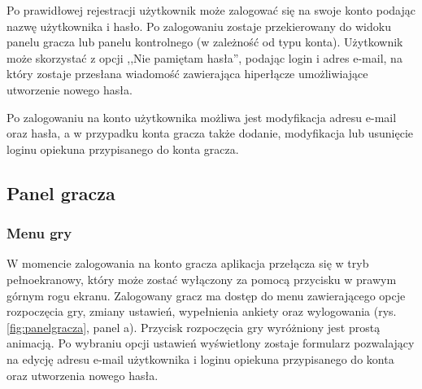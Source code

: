         Po prawidłowej rejestracji użytkownik może zalogować się na swoje konto podając nazwę użytkownika i hasło. Po zalogowaniu zostaje przekierowany do widoku panelu gracza lub panelu kontrolnego (w zależność od typu konta).
        Użytkownik może skorzystać z opcji ,,Nie pamiętam hasła'', podając login i adres e-mail, na który zostaje przesłana wiadomość zawierająca hiperłącze umożliwiające utworzenie nowego hasła.
        
        Po zalogowaniu na konto użytkownika możliwa jest modyfikacja adresu e-mail oraz hasła, a w przypadku konta gracza także dodanie, modyfikacja lub usunięcie loginu opiekuna przypisanego do konta gracza.

    \subsection{Panel gracza}
        
        \subsubsection{Menu gry}
        W momencie zalogowania na konto gracza aplikacja przełącza się w tryb pełnoekranowy, który może zostać wyłączony za pomocą przycisku w prawym górnym rogu ekranu.
        Zalogowany gracz ma dostęp do menu zawierającego opcje rozpoczęcia gry, zmiany ustawień, wypełnienia ankiety oraz wylogowania (rys. \ref{fig:panelgracza}, panel a).
        Przycisk rozpoczęcia gry wyróżniony jest prostą animacją.
        Po wybraniu opcji ustawień wyświetlony zostaje formularz pozwalający na edycję adresu e-mail użytkownika i loginu opiekuna przypisanego do konta oraz utworzenia nowego hasła.
        
